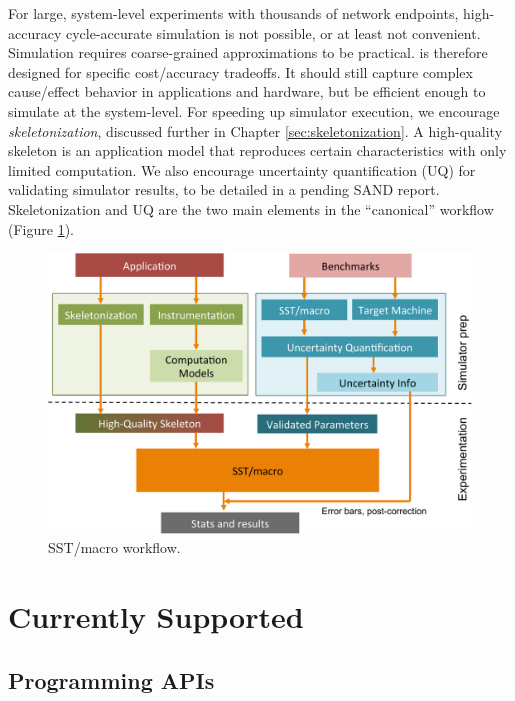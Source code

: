 For large, system-level experiments with thousands of network endpoints, high-accuracy cycle-accurate simulation is not possible,
or at least not convenient.
Simulation requires coarse-grained approximations to be practical.
\sstmacro is therefore designed for specific cost/accuracy tradeoffs.
It should still capture complex cause/effect behavior in applications and hardware, but be efficient enough to simulate at the system-level. 
For speeding up simulator execution, we encourage \textit{skeletonization}, discussed further in Chapter \ref{sec:skeletonization}. 
A high-quality skeleton is an application model that reproduces certain characteristics with only limited computation.  
We also encourage uncertainty quantification (UQ) for validating simulator results,
to be detailed in a pending SAND report.  
Skeletonization and UQ are the two main elements in the ``canonical'' \sstmacro workflow (Figure \ref{fig:workflow}).

\begin{figure}[t]
  \centering
    \includegraphics[width=0.99\columnwidth]{figures/workflow.pdf}
      \caption{SST/macro workflow. }
      \label{fig:workflow}
\end{figure}

\section{Currently Supported}
\label{sec:intro:supported}

\subsection{Programming APIs}
\label{subsec:intro:apis}

